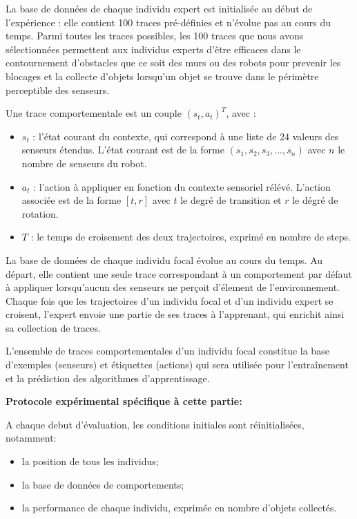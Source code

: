 \documentclass[a4paper, 12pt]{report}
\begin{document}
	La base de données de chaque individu expert est initialisée au début de l'expérience : elle contient 100 traces pré-définies et n'évolue pas au cours du temps. Parmi toutes les traces possibles, les 100 traces que nous avons sélectionnées permettent aux individus experts d'être efficaces dans le contournement d'obstacles que ce soit des murs ou des robots pour prevenir les blocages et la collecte d'objets lorsqu'un objet se trouve dans le périmètre perceptible des senseurs.
	
	Une trace comportementale est un couple $( s_t, a_t )^T$, avec :
	\begin{itemize}
	\item $s_t$ : l'état courant du contexte, qui correspond à une liste de 24 valeurs des senseurs étendus. L'état courant est de la forme 
    $(s_1, s_2, s_3, ..., s_n)$ avec $n$ le nombre de senseurs du robot. 
	\item $a_t$ : l'action à appliquer en fonction du contexte sensoriel rélévé. L'action associée est de la forme $[t,r]$ avec $t$ le degré de transition et $r$ le dégré de rotation.
	\item $T$ : le temps de croisement des deux trajectoires, exprimé en nombre de steps. 
	\end{itemize}


	La base de données de chaque individu focal évolue au cours du temps. Au départ, elle contient une seule trace correspondant à un comportement par défaut à appliquer lorsqu'aucun des senseurs ne perçoit d'élement de l'environnement. Chaque fois que les trajectoires d'un individu focal et d'un individu expert se croisent, l'expert envoie une partie de ses traces à l'apprenant, qui enrichit ainsi sa collection de traces.
	
    L'ensemble de traces comportementales d'un individu focal constitue la base d'exemples (senseurs) et étiquettes (actions) qui sera utilisée pour l'entraînement et la prédiction des algorithmes d'apprentissage.
    
    \:
    
    \textbf{Protocole expérimental spécifique à cette partie:} 
    
    A chaque debut d'évaluation, les conditions initiales sont réinitialisées, notamment:
    \begin{itemize}
	\item la position de tous les individus;
    \item la base de données de comportements;
    \item la performance de chaque individu, exprimée en nombre d'objets collectés.
	\end{itemize}
    
\end{document}
